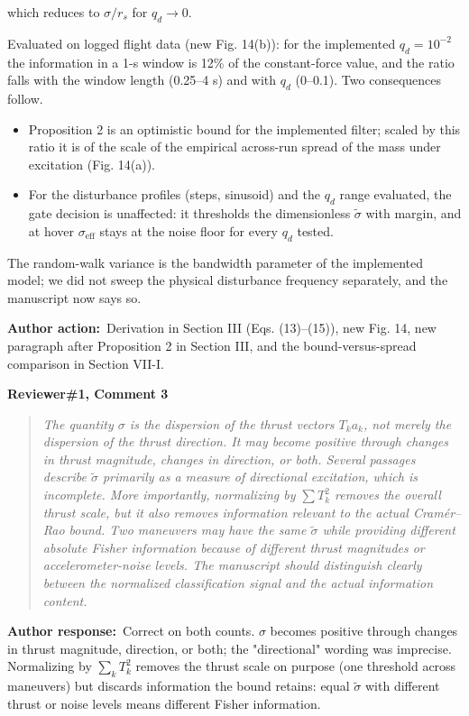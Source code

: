 \documentclass[11pt]{article}
\newcommand{\concern}[1]{\par\medskip\noindent\colorbox{gray!12}{\parbox{\dimexpr\linewidth-2\fboxsep}{\textbf{#1}}}\par\smallskip}
\newcommand{\rlabel}[1]{\par\textbf{#1}\ }
\begin{document}
which reduces to $\sigma/r_s$ for $q_d \to 0$.

Evaluated on logged flight data (new Fig. 14(b)): for the implemented $q_d = 10^{-2}$ the information in a 1-s window is 12\% of the constant-force value, and the ratio falls with the window length (0.25--4 s) and with $q_d$ (0--0.1). Two consequences follow.

\begin{itemize}[leftmargin=1.4em]
\item Proposition 2 is an optimistic bound for the implemented filter; scaled by this ratio it is of the scale of the empirical across-run spread of the mass under excitation (Fig. 14(a)).
\item For the disturbance profiles (steps, sinusoid) and the $q_d$ range evaluated, the gate decision is unaffected: it thresholds the dimensionless $\tilde\sigma$ with margin, and at hover $\sigma_{\mathrm{eff}}$ stays at the noise floor for every $q_d$ tested.
\end{itemize}

The random-walk variance is the bandwidth parameter of the implemented model; we did not sweep the physical disturbance frequency separately, and the manuscript now says so.

\rlabel{Author action:}Derivation in Section III (Eqs. (13)--(15)), new Fig. 14, new paragraph after Proposition 2 in Section III, and the bound-versus-spread comparison in Section VII-I.

\concern{Reviewer\#1, Comment 3}

\begin{quote}\itshape The quantity $\sigma$ is the dispersion of the thrust vectors $T_k a_k$, not merely the dispersion of the thrust direction. It may become positive through changes in thrust magnitude, changes in direction, or both. Several passages describe $\tilde\sigma$ primarily as a measure of directional excitation, which is incomplete. More importantly, normalizing by $\sum T_k^2$ removes the overall thrust scale, but it also removes information relevant to the actual Cram\'er--Rao bound. Two maneuvers may have the same $\tilde\sigma$ while providing different absolute Fisher information because of different thrust magnitudes or accelerometer-noise levels. The manuscript should distinguish clearly between the normalized classification signal and the actual information content.\end{quote}

\rlabel{Author response:}Correct on both counts. $\sigma$ becomes positive through changes in thrust magnitude, direction, or both; the "directional" wording was imprecise. Normalizing by $\sum_k T_k^2$ removes the thrust scale on purpose (one threshold across maneuvers) but discards information the bound retains: equal $\tilde\sigma$ with different thrust or noise levels means different Fisher information.
\end{document}
